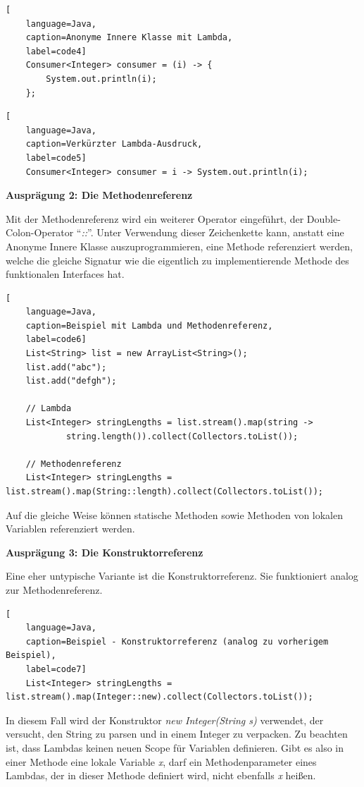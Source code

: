 \begin{lstlisting}[
    language=Java,
    caption=Anonyme Innere Klasse mit Lambda,
    label=code4]
	Consumer<Integer> consumer = (i) -> {
		System.out.println(i);
	};
\end{lstlisting}  

\begin{lstlisting}[
    language=Java,
    caption=Verkürzter Lambda-Ausdruck,
    label=code5]
	Consumer<Integer> consumer = i -> System.out.println(i);	
\end{lstlisting}  

\textbf{Ausprägung 2: Die Methodenreferenz}

Mit der Methodenreferenz wird ein weiterer Operator eingeführt, der Double-Colon-Operator \enquote{\textit{::}}. Unter Verwendung dieser Zeichenkette kann, anstatt eine Anonyme Innere Klasse auszuprogrammieren, eine Methode referenziert werden, welche die gleiche Signatur wie die eigentlich zu implementierende Methode des funktionalen Interfaces hat. \cite[S. 81f.]{Ullenboom2014}

\begin{lstlisting}[
    language=Java,
    caption=Beispiel mit Lambda und Methodenreferenz,
    label=code6]
	List<String> list = new ArrayList<String>();
	list.add("abc");
	list.add("defgh");	
	
	// Lambda
	List<Integer> stringLengths = list.stream().map(string ->
			string.length()).collect(Collectors.toList());	
	
	// Methodenreferenz
	List<Integer> stringLengths = list.stream().map(String::length).collect(Collectors.toList());
\end{lstlisting}  

Auf die gleiche Weise können statische Methoden sowie Methoden von lokalen Variablen referenziert werden.

\textbf{Ausprägung 3: Die Konstruktorreferenz}

Eine eher untypische Variante ist die Konstruktorreferenz. Sie funktioniert analog zur Methodenreferenz. \cite[S. 83f.]{Ullenboom2014}

\begin{lstlisting}[
    language=Java,
    caption=Beispiel - Konstruktorreferenz (analog zu vorherigem Beispiel),
    label=code7]
	List<Integer> stringLengths = list.stream().map(Integer::new).collect(Collectors.toList());
\end{lstlisting} 

In diesem Fall wird der Konstruktor \textit{new Integer(String s)} verwendet, der versucht, den String zu parsen und in einem Integer zu verpacken.
Zu beachten ist, dass Lambdas keinen neuen Scope für Variablen definieren. Gibt es also in einer Methode eine lokale Variable \textit{x}, darf ein Methodenparameter eines Lambdas, der in dieser Methode definiert wird, nicht ebenfalls \textit{x} heißen. \cite{OracleLambda}

